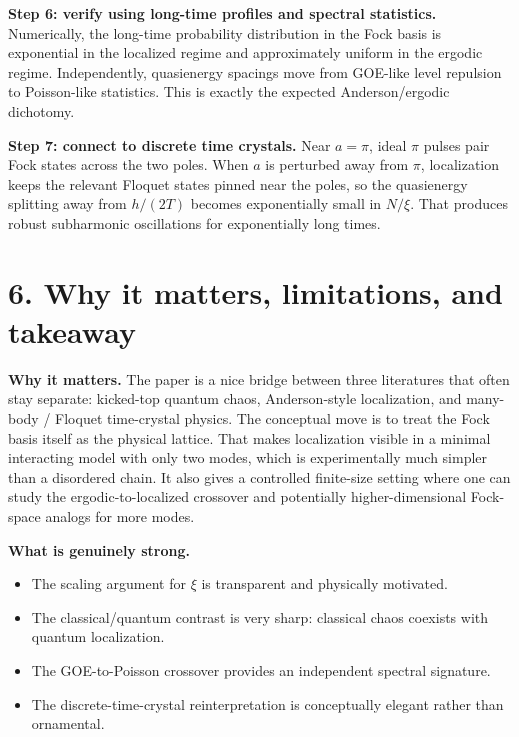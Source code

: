 \documentclass[11pt]{article}
\begin{document}
\textbf{Step 6: verify using long-time profiles and spectral statistics.} Numerically, the long-time probability distribution in the Fock basis is exponential in the localized regime and approximately uniform in the ergodic regime. Independently, quasienergy spacings move from GOE-like level repulsion to Poisson-like statistics. This is exactly the expected Anderson/ergodic dichotomy.

\textbf{Step 7: connect to discrete time crystals.} Near $a=\pi$, ideal $\pi$ pulses pair Fock states across the two poles. When $a$ is perturbed away from $\pi$, localization keeps the relevant Floquet states pinned near the poles, so the quasienergy splitting away from $h/(2T)$ becomes exponentially small in $N/\xi$. That produces robust subharmonic oscillations for exponentially long times.

\section*{6. Why it matters, limitations, and takeaway}
\textbf{Why it matters.} The paper is a nice bridge between three literatures that often stay separate: kicked-top quantum chaos, Anderson-style localization, and many-body / Floquet time-crystal physics. The conceptual move is to treat the Fock basis itself as the physical lattice. That makes localization visible in a minimal interacting model with only two modes, which is experimentally much simpler than a disordered chain. It also gives a controlled finite-size setting where one can study the ergodic-to-localized crossover and potentially higher-dimensional Fock-space analogs for more modes.

\textbf{What is genuinely strong.}
\begin{itemize}
  \item The scaling argument for $\xi$ is transparent and physically motivated.
  \item The classical/quantum contrast is very sharp: classical chaos coexists with quantum localization.
  \item The GOE-to-Poisson crossover provides an independent spectral signature.
  \item The discrete-time-crystal reinterpretation is conceptually elegant rather than ornamental.
\end{itemize}
\end{document}
